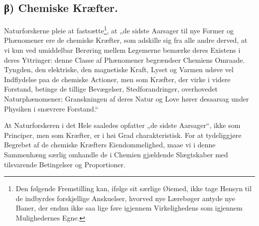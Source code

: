 \documentclass[12pt,a4paper]{book}
\begin{document}
\subsection*{β) Chemiske Kræfter.}
Naturforskerne pleie at fastsætte\footnote{Den følgende
Fremstilling kan, ifølge sit særlige Øiemed, ikke tage Hensyn til
de indbyrdes forskjellige Anskuelser, hvorved nye
Lærebøger antyde nye Baner, der endnu ikke saa lige føre igjennem
Virkelighedens som igjennem Mulighedernes Egne.}, at „de sidste
Aarsager til
nye Former og Phænomener ere de chemiske Kræfter, som adskille sig
fra alle andre derved, at vi kun ved umiddelbar Berøring mellem
Legemerne bemærke deres Existens i deres Yttringer: denne Classe af
Phænomener begrændser Chemiens Omraade. Tyngden, den elektriske,
den magnetiske Kraft, Lyset og Varmen udøve vel Indflydelse paa de
chemiske Actioner, men som Kræfter, der virke i videre Forstand,
betinge de tillige Bevægelser, Stedforandringer, overhovedet
Naturphænomener; Granskningen af deres Natur og Love hører
desaarsag under Physiken i snævrere Forstand.“

At Naturforskeren i det Hele saaledes opfatter „de sidste
Aarsager“, ikke som Principer, men som Kræfter, er i høi Grad
charakteristisk. For at tydeliggjøre Begrebet af de chemiske
Kræfters Eiendommelighed, maae vi i denne Sammenhæng særlig
omhandle de i Chemien gjældende Slægtskaber med tilsvarende
Betingelser og Proportioner.
\end{document}
